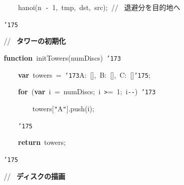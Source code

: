 \documentclass[a4paper,10pt]{article}
\def\mc{\relax}
\begin{document}
\noindent
\mbox{}{\tt\mc \ }{\tt\mc \ }{\tt\mc \ }{\tt\mc \ }{\tt\mc \ }{\tt\mc \ }{\tt\mc \ }{\tt\mc \ }{\tt\mc \ }{\tt\mc \ }{\tt\mc \ }{\tt\mc \ }hanoi(n{\tt\mc \ }{\tt -}{\tt\mc \ }1,{\tt\mc \ }tmp,{\tt\mc \ }dst,{\tt\mc \ }src);{\tt\mc \ }\rm\mc // \ 退避分を目的地へ \hfill
\tt\mc 

\noindent
\mbox{}{\tt\mc \ }{\tt\mc \ }{\tt\mc \ }{\tt\mc \ }{\tt\mc \ }{\tt\mc \ }{\tt\mc \ }{\tt\mc \ }{\tt\char'175}

\noindent
\mbox{}\hfill

\noindent
\mbox{}{\tt\mc \ }{\tt\mc \ }{\tt\mc \ }{\tt\mc \ }{\tt\mc \ }{\tt\mc \ }{\tt\mc \ }{\tt\mc \ }\rm\mc // \ {\bf タワーの初期化} \hfill
\tt\mc 

\noindent
\mbox{}{\tt\mc \ }{\tt\mc \ }{\tt\mc \ }{\tt\mc \ }{\tt\mc \ }{\tt\mc \ }{\tt\mc \ }{\tt\mc \ }\textbf{function}{\tt\mc \ }initTowers(numDiscs){\tt\mc \ }{\tt\char'173}

\noindent
\mbox{}{\tt\mc \ }{\tt\mc \ }{\tt\mc \ }{\tt\mc \ }{\tt\mc \ }{\tt\mc \ }{\tt\mc \ }{\tt\mc \ }{\tt\mc \ }{\tt\mc \ }{\tt\mc \ }{\tt\mc \ }\textbf{var}{\tt\mc \ }towers{\tt\mc \ }={\tt\mc \ }{\tt\char'173}A:{\tt\mc \ }[],{\tt\mc \ }B:{\tt\mc \ }[],{\tt\mc \ }C:{\tt\mc \ }[]{\tt\char'175};

\noindent
\mbox{}{\tt\mc \ }{\tt\mc \ }{\tt\mc \ }{\tt\mc \ }{\tt\mc \ }{\tt\mc \ }{\tt\mc \ }{\tt\mc \ }{\tt\mc \ }{\tt\mc \ }{\tt\mc \ }{\tt\mc \ }\textbf{for}{\tt\mc \ }(\textbf{var}{\tt\mc \ }i{\tt\mc \ }={\tt\mc \ }numDiscs;{\tt\mc \ }i{\tt\mc \ }{\tt >}={\tt\mc \ }1;{\tt\mc \ }i{\tt -}{\tt -}){\tt\mc \ }{\tt\char'173}

\noindent
\mbox{}{\tt\mc \ }{\tt\mc \ }{\tt\mc \ }{\tt\mc \ }{\tt\mc \ }{\tt\mc \ }{\tt\mc \ }{\tt\mc \ }{\tt\mc \ }{\tt\mc \ }{\tt\mc \ }{\tt\mc \ }{\tt\mc \ }{\tt\mc \ }{\tt\mc \ }{\tt\mc \ }towers[{\tt "}A{\tt "}].push(i);

\noindent
\mbox{}{\tt\mc \ }{\tt\mc \ }{\tt\mc \ }{\tt\mc \ }{\tt\mc \ }{\tt\mc \ }{\tt\mc \ }{\tt\mc \ }{\tt\mc \ }{\tt\mc \ }{\tt\mc \ }{\tt\mc \ }{\tt\char'175}

\noindent
\mbox{}{\tt\mc \ }{\tt\mc \ }{\tt\mc \ }{\tt\mc \ }{\tt\mc \ }{\tt\mc \ }{\tt\mc \ }{\tt\mc \ }{\tt\mc \ }{\tt\mc \ }{\tt\mc \ }{\tt\mc \ }\textbf{return}{\tt\mc \ }towers;

\noindent
\mbox{}{\tt\mc \ }{\tt\mc \ }{\tt\mc \ }{\tt\mc \ }{\tt\mc \ }{\tt\mc \ }{\tt\mc \ }{\tt\mc \ }{\tt\char'175}

\noindent
\mbox{}\hfill

\noindent
\mbox{}{\tt\mc \ }{\tt\mc \ }{\tt\mc \ }{\tt\mc \ }{\tt\mc \ }{\tt\mc \ }{\tt\mc \ }{\tt\mc \ }\rm\mc // \ {\bf ディスクの描画} \hfill
\tt\mc 
\end{document}
